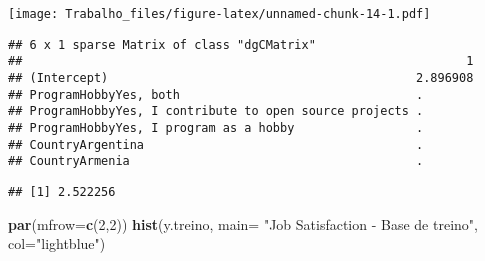 \documentclass[]{article}
\newenvironment{Shaded}{\begin{snugshade}}{\end{snugshade}}
\newcommand{\KeywordTok}[1]{\textcolor[rgb]{0.13,0.29,0.53}{\textbf{#1}}}
\newcommand{\DataTypeTok}[1]{\textcolor[rgb]{0.13,0.29,0.53}{#1}}
\newcommand{\DecValTok}[1]{\textcolor[rgb]{0.00,0.00,0.81}{#1}}
\newcommand{\StringTok}[1]{\textcolor[rgb]{0.31,0.60,0.02}{#1}}
\newcommand{\CommentTok}[1]{\textcolor[rgb]{0.56,0.35,0.01}{\textit{#1}}}
\newcommand{\OperatorTok}[1]{\textcolor[rgb]{0.81,0.36,0.00}{\textbf{#1}}}
\newcommand{\NormalTok}[1]{#1}
\begin{document}
\texttt{[image: Trabalho\_files/figure-latex/unnamed-chunk-14-1.pdf]}

\begin{Shaded}
\end{Shaded}

\begin{verbatim}
## 6 x 1 sparse Matrix of class "dgCMatrix"
##                                                              1
## (Intercept)                                           2.896908
## ProgramHobbyYes, both                                 .       
## ProgramHobbyYes, I contribute to open source projects .       
## ProgramHobbyYes, I program as a hobby                 .       
## CountryArgentina                                      .       
## CountryArmenia                                        .
\end{verbatim}

\begin{Shaded}
\end{Shaded}

\begin{verbatim}
## [1] 2.522256
\end{verbatim}

\begin{Shaded}
\begin{Highlighting}[]
\KeywordTok{par}\NormalTok{(}\DataTypeTok{mfrow=}\KeywordTok{c}\NormalTok{(}\DecValTok{2}\NormalTok{,}\DecValTok{2}\NormalTok{))}
\KeywordTok{hist}\NormalTok{(y.treino, }\DataTypeTok{main=} \StringTok{"Job Satisfaction - Base de treino"}\NormalTok{, }\DataTypeTok{col=}\StringTok{"lightblue"}\NormalTok{)}
\end{Highlighting}
\end{Shaded}
\end{document}
